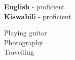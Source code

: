 \documentclass[9pt]{developercv} %
\begin{document}

\begin{minipage}[t]{0.3\textwidth}
	\vspace{-\baselineskip} %

	
	\textbf{English} - proficient\\
	\textbf{Kiswahili} - proficient\\
\end{minipage}
\hfill
\begin{minipage}[t]{0.3\textwidth}
	\vspace{-\baselineskip} %
	
	
	Playing guitar\\
	Photography\\
	Travelling\\
\end{minipage}
\hfill
\begin{minipage}[t]{0.3\textwidth}
	\vspace{-\baselineskip} %
	
	
\end{minipage}

\end{document}
